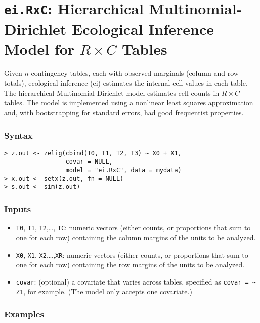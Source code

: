 \section{{\tt ei.RxC}: Hierarchical Multinomial-Dirichlet Ecological
  Inference Model for $R \times C$ Tables}\label{ei.RxC}

Given $n$ contingency tables, each with observed marginals (column and
row totals), ecological inference ({\sc ei}) estimates the internal
cell values in each table.  The hierarchical Multinomial-Dirichlet
model estimates cell counts in $R \times C$ tables. The model is
implemented using a nonlinear least squares approximation and, with
bootstrapping for standard errors, had good frequentist properties.

\subsubsection{Syntax}
\begin{verbatim}
> z.out <- zelig(cbind(T0, T1, T2, T3) ~ X0 + X1, 
                 covar = NULL, 
                 model = "ei.RxC", data = mydata)
> x.out <- setx(z.out, fn = NULL)
> s.out <- sim(z.out)
\end{verbatim}

\subsubsection{Inputs}

\begin{itemize}
\item \texttt{T0}, \texttt{T1}, \texttt{T2},\ldots, \texttt{TC}:
  numeric vectors (either counts, or proportions that sum to one for
  each row) containing the column margins of the units to be analyzed.

\item \texttt{X0}, {\tt X1}, {\tt X2},\ldots,{\tt XR}: numeric vectors
  (either counts, or proportions that sum to one for each row)
  containing the row margins of the units to be analyzed.

\item {\tt covar}: (optional) a covariate that varies across tables,
specified as \verb|covar = ~ Z1|, for example.  (The model only
accepts one covariate.)
\end{itemize}

\subsubsection{Examples}

